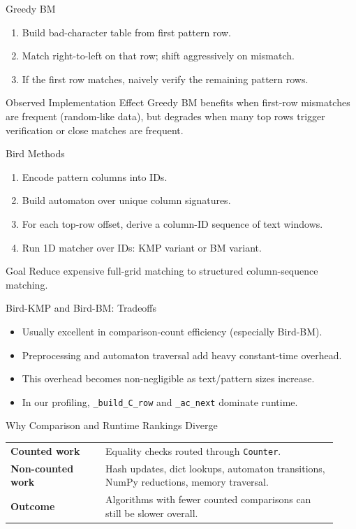 \begin{frame}{Greedy BM}
\small
\begin{enumerate}
  \item Build bad-character table from first pattern row.
  \item Match right-to-left on that row; shift aggressively on mismatch.
  \item If the first row matches, naively verify the remaining pattern rows.
\end{enumerate}
\begin{block}{Observed Implementation Effect}
Greedy BM benefits when first-row mismatches are frequent (random-like data), but degrades when many top rows trigger verification or close matches are frequent.
\end{block}
\end{frame}

\begin{frame}{Bird Methods}
\small
\begin{enumerate}
  \item Encode pattern columns into IDs.
  \item Build automaton over unique column signatures.
  \item For each top-row offset, derive a column-ID sequence of text windows.
  \item Run 1D matcher over IDs: KMP variant or BM variant.
\end{enumerate}
\begin{block}{Goal}
Reduce expensive full-grid matching to structured column-sequence matching.
\end{block}
\end{frame}

\begin{frame}{Bird-KMP and Bird-BM: Tradeoffs}
\small
\begin{itemize}
  \item Usually excellent in comparison-count efficiency (especially Bird-BM).
  \item Preprocessing and automaton traversal add heavy constant-time overhead.
  \item This overhead becomes non-negligible as text/pattern sizes increase.
  \item In our profiling, \texttt{\_build\_C\_row} and \texttt{\_ac\_next} dominate runtime.
\end{itemize}
\end{frame}

\begin{frame}{Why Comparison and Runtime Rankings Diverge}
\small
\begin{tabular}{>{\bfseries}p{0.27\linewidth}p{0.66\linewidth}}
Counted work & Equality checks routed through \texttt{Counter}. \\
Non-counted work & Hash updates, dict lookups, automaton transitions, NumPy reductions, memory traversal. \\
Outcome & Algorithms with fewer counted comparisons can still be slower overall. \\
\end{tabular}
\end{frame}


